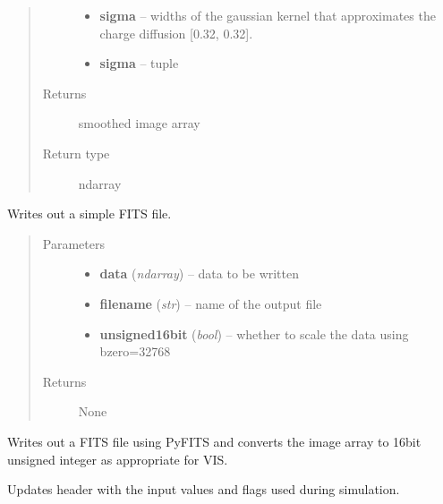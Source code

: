 \documentclass[a4paper,11pt,english]{sphinxmanual}
\begin{document}
\begin{fulllineitems}
\begin{fulllineitems}
\begin{quote}
\begin{description}
\begin{itemize}
\item {} 
\textbf{sigma} -- widths of the gaussian kernel that approximates the charge diffusion {[}0.32, 0.32{]}.

\item {} 
\textbf{sigma} -- tuple

\end{itemize}

\item[{Returns}] \leavevmode
smoothed image array

\item[{Return type}] \leavevmode
ndarray

\end{description}\end{quote}

\end{fulllineitems}


\begin{fulllineitems}
\label{simulator:simulator.simulator.VISsimulator.writeFITSfile}
Writes out a simple FITS file.
\begin{quote}\begin{description}
\item[{Parameters}] \leavevmode\begin{itemize}
\item {} 
\textbf{data} (\emph{ndarray}) -- data to be written

\item {} 
\textbf{filename} (\emph{str}) -- name of the output file

\item {} 
\textbf{unsigned16bit} (\emph{bool}) -- whether to scale the data using bzero=32768

\end{itemize}

\item[{Returns}] \leavevmode
None

\end{description}\end{quote}

\end{fulllineitems}


\begin{fulllineitems}
\label{simulator:simulator.simulator.VISsimulator.writeOutputs}
Writes out a FITS file using PyFITS and converts the image array to 16bit unsigned integer as
appropriate for VIS.

Updates header with the input values and flags used during simulation.

\end{fulllineitems}


\end{fulllineitems}
\end{document}
